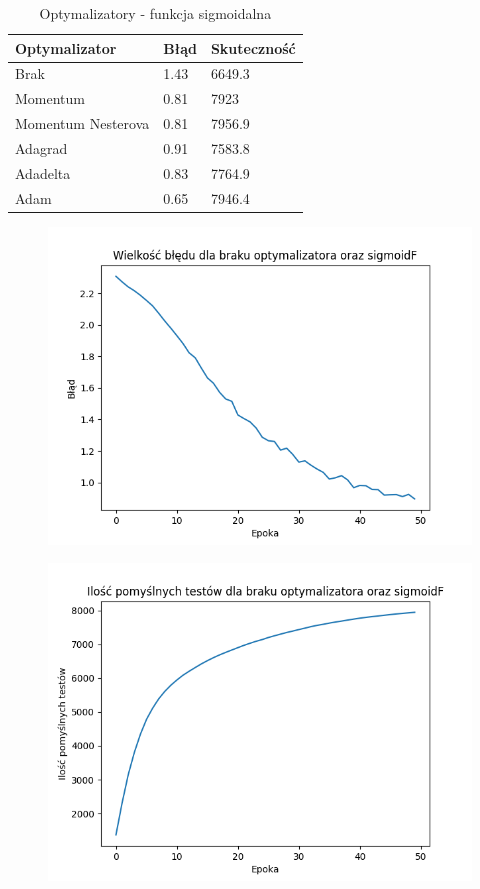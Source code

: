 \documentclass{article}
\begin{document}
\begin{table}[h]
  \centering
    
  \bgroup
  \def\arraystretch{1.3}
\begin{tabular}{|l|l|l|}
\hline
Optymalizator & Błąd & Skuteczność \\ \hline
Brak & 1.43 & 6649.3 \\ \hline
Momentum & 0.81 & 7923 \\ \hline
Momentum Nesterova & 0.81 & 7956.9 \\ \hline
Adagrad & 0.91 & 7583.8 \\ \hline
Adadelta & 0.83 & 7764.9 \\ \hline
Adam & 0.65 & 7946.4 \\ \hline
\end{tabular}
  \egroup
  \vspace{10pt}
  \caption{Optymalizatory - funkcja sigmoidalna}
\end{table}

\newpage

\begin{figure}[!htb]
  \centering
  \includegraphics[width=\linewidth]{error_none_sigmoidF.png}
\end{figure}

\begin{figure}[!htb]
  \centering
  \includegraphics[width=\linewidth]{test_none_sigmoidF.png}
\end{figure}
\end{document}

